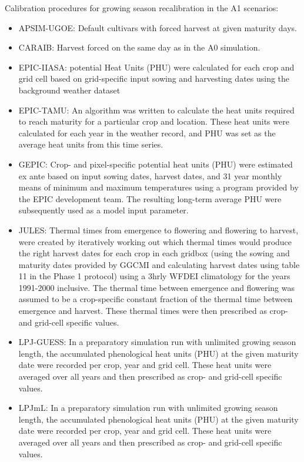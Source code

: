 \documentclass[10pt]{article}
\begin{document}
Calibration procedures for growing season recalibration in the A1 scenarios:
\begin{itemize}
    \item APSIM-UGOE: Default cultivars with forced harvest at given maturity days.
    \item CARAIB: Harvest forced on the same day as in the A0 simulation.
    \item EPIC-IIASA: potential Heat Units (PHU) were calculated for each crop and grid cell based on grid-specific input sowing and harvesting dates using the background weather dataset
    \item EPIC-TAMU: An algorithm was written to calculate the heat units required to reach maturity for a particular crop and location. These heat units were calculated for each year in the weather record, and PHU was set as the average heat units from this time series.
    \item GEPIC: Crop- and pixel-specific potential heat units (PHU) were estimated ex ante based on input sowing dates, harvest dates, and 31 year monthly means of minimum and maximum temperatures using a program provided by the EPIC development team. The resulting long-term average PHU were subsequently used as a model input parameter.
    \item JULES: Thermal times from emergence to flowering and flowering to harvest, were created by iteratively working out which thermal times would produce the right harvest dates for each crop in each gridbox (using the sowing and maturity dates provided by GGCMI and calculating harvest dates using table 11 in the Phase 1 protocol) using a 3hrly WFDEI climatology for the years 1991-2000 inclusive. The thermal time between emergence and flowering was assumed to be a crop-specific constant fraction of the thermal time between emergence and harvest. These thermal times were then prescribed as crop- and grid-cell specific values.
    \item LPJ-GUESS: In a preparatory simulation run with unlimited growing season length, the accumulated phenological heat units (PHU) at the given maturity date were recorded per crop, year and grid cell. These heat units were averaged over all years and then prescribed as crop- and grid-cell specific values.
    \item LPJmL: In a preparatory simulation run with unlimited growing season length, the accumulated phenological heat units (PHU) at the given maturity date were recorded per crop, year and grid cell. These heat units were averaged over all years and then prescribed as crop- and grid-cell specific values.

\end{itemize}
\end{document}
